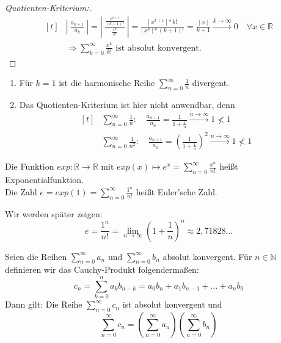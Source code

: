\documentclass[a4paper,titlepage,oneside]{article}
\def\N{\ensuremath{\mathbb{N}} }
\def\R{\ensuremath{\mathbb{R}} }
\def\e{\ensuremath{\mathit{e}} }
\newcommand{\suminf}[2][n]{\ensuremath{\sum_{#1= 0}^{\infty}{#2}}}
\renewcommand{\liminf}[2][n]{\ensuremath{\lim\limits_{#1 \rightarrow \infty}{#2}}}
\newcommand{\abs}[1]{\ensuremath{\left|\:#1\:\right|}}
\newcommand{\longtoinf}[1][n]{\ensuremath{\overset{\scriptscriptstyle{#1 \to \infty}}{\longrightarrow}}}
\theoremstyle{thmstyle}
\begin{document}
\begin{subbsp}
\begin{enumerate}
\begin{proof}[Quotienten-Kriterium:]
\[\begin{aligned}[t]
&\abs{\frac{a_{k+1}}{a_k}} = \abs{\frac{\frac{x^{k+1}}{(k+1)!}}{\frac{x^k}{k!}}} = \frac{\abs{x^{k+1}} * k!}{\abs{x^k} * (k+1)!} = \frac{\abs{x}}{k+1} \overset{k \to \infty}{\longrightarrow} 0 \quad \forall x \in \R \\
&\Rightarrow \suminf[k]{\frac{x^k}{k!}} \text{ ist absolut konvergent.}
\end{aligned}\]
\end{proof}
\end{enumerate}
\end{subbsp}

\begin{subbem}
\begin{enumerate}
\item Für \(k = 1\) ist die harmonische Reihe \suminf{\frac{1}{n}} divergent.
\item Das Quotienten-Kriterium ist hier nicht anwendbar, denn \\
\[\begin{aligned}[t]
&\suminf{\frac{1}{n}} : \quad \frac{a_{n+1}}{a_n} = \frac{1}{1 + \frac{1}{n}} \longtoinf 1 \not < 1 \\
&\suminf{\frac{1}{n^2}} : \quad \frac{a_{n+1}}{a_n} = \left(\frac{1}{1 + \frac{1}{n}}\right)^2 \longtoinf 1 \not < 1
\end{aligned}\]
\end{enumerate}
\end{subbem}

\begin{subdefi}
Die Funktion \(exp: \R \to \R \text{ mit } exp(x) \mapsto \e^x = \suminf{\frac{x^n}{n!}}\) heißt Exponentialfunktion.\\
Die Zahl \(\e = exp(1) = \suminf{\frac{1^n}{n!}} \) heißt Euler'sche Zahl.
\end{subdefi}

\begin{subbem}
Wir werden später zeigen:
\[\e = \frac{1^n}{n!} = \liminf{\left(1 + \frac{1}{n}\right)^n} \approx 2,71828...\]
\end{subbem}

\begin{subsatz}
Seien die Reihen \suminf{a_n} und \suminf{b_n} absolut konvergent. Für $n \in \N$ definieren wir das Cauchy-Produkt folgendermaßen:
\[c_n = \sum_{k = 0}^{n}{a_k b_{n-k}} = a_0 b_n + a_1b_{n-1} + \dots + a_n b_0\]
Dann gilt: Die Reihe \suminf{c_n} ist absolut konvergent und \\
\[\suminf{c_n} = \left( \suminf{a_n} \right)  \left( \suminf{b_n} \right)\]
\proof[Beweisidee:]
\end{subsatz}
\end{document}
